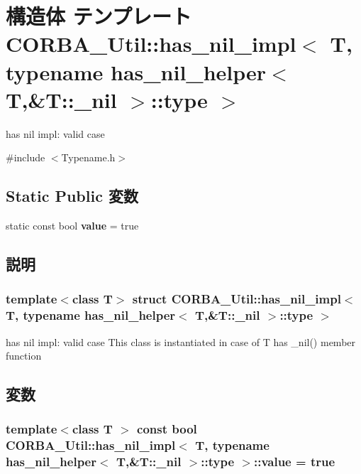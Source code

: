 \section{構造体 テンプレート CORBA\_\-Util::has\_\-nil\_\-impl$<$ T, typename has\_\-nil\_\-helper$<$ T,\&T::\_\-nil $>$::type $>$}
\label{structCORBA__Util_1_1has__nil__impl_3_01T_00_01typename_01has__nil__helper_3_01T_00_6T_1_1__nil_01_4_1_1type_01_4}


has nil impl: valid case  




{\ttfamily \#include $<$Typename.h$>$}

\subsection*{Static Public 変数}
\begin{DoxyCompactItemize}
\item 
static const bool {\bf value} = true
\end{DoxyCompactItemize}


\subsection{説明}
\subsubsection*{template$<$class T$>$ struct CORBA\_\-Util::has\_\-nil\_\-impl$<$ T, typename has\_\-nil\_\-helper$<$ T,\&T::\_\-nil $>$::type $>$}

has nil impl: valid case This class is instantiated in case of T has \_\-nil() member function 

\subsection{変数}
\subsubsection[{value}]{\setlength{\rightskip}{0pt plus 5cm}template$<$class T $>$ const bool {\bf CORBA\_\-Util::has\_\-nil\_\-impl}$<$ T, typename {\bf has\_\-nil\_\-helper}$<$ T,\&T::\_\-nil $>$::type $>$::{\bf value} = true\hspace{0.3cm}{\ttfamily  [static]}}\label{structCORBA__Util_1_1has__nil__impl_3_01T_00_01typename_01has__nil__helper_3_01T_00_6T_1_1__nil_01_4_1_1type_01_4_a2dbb211642330d4fc58bc23d32462c8b}
